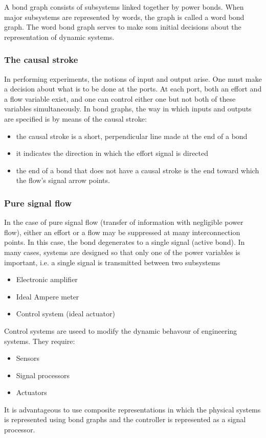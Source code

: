 \documentclass{book}
\begin{document}
A bond graph consists of subsystems linked together by power bonds. When major subsystems are represented by words, the graph is called a word bond graph. The word bond graph serves to make som initial decisions about the representation of dynamic systems.

\subsubsection{The causal stroke}
In performing experiments, the notions of input and output arise. One must make a decision about what  is to be done at the ports. At each port, both an effort and a flow variable exist, and one can control either one but not both of these variables simultaneously. In bond graphs, the way in which inputs and outputs are specified is by means of the causal stroke: \begin{itemize}
    \item the causal stroke is a short, perpendicular line made at the end of a bond
    \item it indicates the direction in which the effort signal is directed 
    \item the end of a bond that does not have a causal stroke is the end toward which the flow's signal arrow points.
\end{itemize}

\subsubsection{Pure signal flow}
In the case of pure signal flow (transfer of information with negligible power flow), either an effort or a flow may be suppressed at many interconnection points. In this case, the bond degenerates to a single signal (active bond). In many cases, systems are designed so that only one of the power variables is important, i.e. a single signal is transmitted between two subsystems 
\begin{itemize}
    \item Electronic amplifier
    \item Ideal Ampere meter 
    \item Control system (ideal actuator)
\end{itemize}
Control systems are useed to modify the dynamic behavour of engineering systems. They require: 
\begin{itemize}
    \item Sensors
    \item Signal processors 
    \item Actuators 
\end{itemize}
It is advantageous to use composite representations in which the physical systems is represented using bond graphs and the controller is represented as a signal processor.
\end{document}
